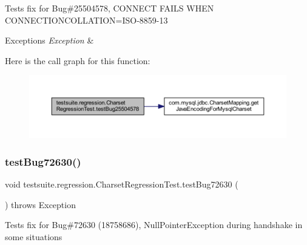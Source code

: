Tests fix for Bug\#25504578, C\+O\+N\+N\+E\+CT F\+A\+I\+LS W\+H\+EN C\+O\+N\+N\+E\+C\+T\+I\+O\+N\+C\+O\+L\+L\+A\+T\+I\+ON=I\+S\+O-\/8859-\/13


\begin{DoxyExceptions}{Exceptions}
{\em Exception} & \\
\hline
\end{DoxyExceptions}
Here is the call graph for this function\+:
\nopagebreak
\begin{figure}[H]
\begin{center}
\leavevmode
\includegraphics[width=350pt]{classtestsuite_1_1regression_1_1_charset_regression_test_a576343bc13a21ec028c8341e914f7e84_cgraph}
\end{center}
\end{figure}
\mbox{\label{classtestsuite_1_1regression_1_1_charset_regression_test_aea47a9d0535dd2e8b09f2be63c4c5100}} 
\subsubsection{\texorpdfstring{test\+Bug72630()}{testBug72630()}}
{\footnotesize\ttfamily void testsuite.\+regression.\+Charset\+Regression\+Test.\+test\+Bug72630 (\begin{DoxyParamCaption}{ }\end{DoxyParamCaption}) throws Exception}

Tests fix for Bug\#72630 (18758686), Null\+Pointer\+Exception during handshake in some situations


